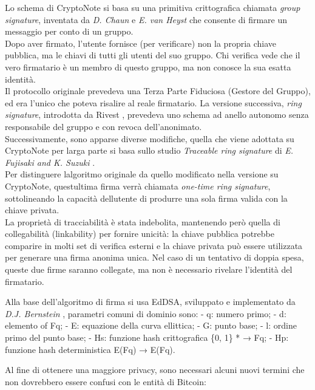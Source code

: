 Lo schema di CryptoNote si basa su una primitiva crittografica chiamata
\emph{group signature}, inventata da \emph{D. Chaun} e \emph{E. van
Heyst} \cite{chaum_van_heyst} che consente di firmare un messaggio per conto di un
gruppo.\\
Dopo aver firmato, l'utente fornisce (per verificare) non la propria
chiave pubblica, ma le chiavi di tutti gli utenti del suo gruppo. Chi
verifica vede che il vero firmatario è un membro di questo gruppo, ma
non conosce la sua esatta identità.\\
Il protocollo originale prevedeva una Terza Parte Fiduciosa (Gestore del
Gruppo), ed era l'unico che poteva risalire al reale firmatario. La
versione successiva, \emph{ring} \emph{signature}, introdotta da Rivest
\cite{rivest_et_al} , prevedeva uno schema ad anello autonomo senza
responsabile del gruppo e con revoca dell'anonimato.\\
Successivamente, sono apparse diverse modifiche, quella che viene
adottata su CryptoNote per larga parte si basa sullo studio
\emph{Traceable ring signature} di \emph{E. Fujisaki and K. Suzuki}
\cite{fujisaki_suzuki}.\\
Per distinguere l\textquotesingle algoritmo originale da quello
modificato nella versione su CryptoNote, quest\textquotesingle ultima
firma verrà chiamata \emph{one-time ring signature}, sottolineando la
capacità dell\textquotesingle utente di produrre una sola firma valida
con la chiave privata.\\
La proprietà di tracciabilità è stata indebolita, mantenendo però quella
di collegabilità (linkability) per fornire unicità: la chiave pubblica
potrebbe comparire in molti set di verifica esterni e la chiave privata
può essere utilizzata per generare una firma anonima unica. Nel caso di
un tentativo di doppia spesa, queste due firme saranno collegate, ma non
è necessario rivelare l'identità del firmatario.

Alla base dell'algoritmo di firma si usa EdDSA, sviluppato e
implementato da \emph{D.J. Bernstein} \cite{bernstein_et_al}, parametri comuni di
dominio sono: - q: numero primo; - d: elemento of Fq; - E: equazione
della curva ellittica; - G: punto base; - l: ordine primo del punto
base; - Hs: funzione hash crittografica \{0, 1\} * → Fq; - Hp: funzione
hash deterministica E(Fq) → E(Fq).

Al fine di ottenere una maggiore privacy, sono necessari alcuni nuovi
termini che non dovrebbero essere confusi con le entità di Bitcoin:


